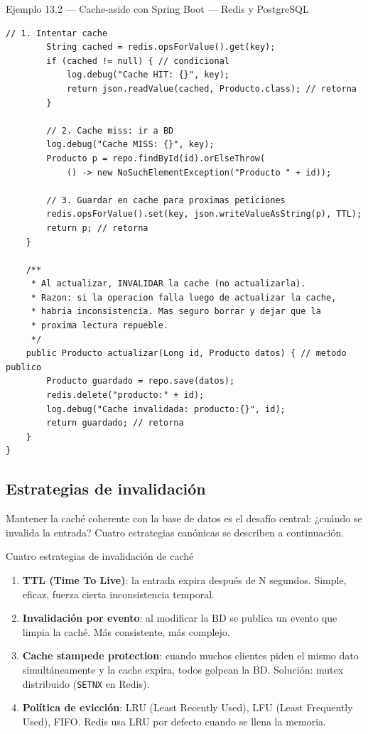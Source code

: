 \begin{cajaejemplo}{Ejemplo 13.2 --- Cache-aside con Spring Boot --- Redis y PostgreSQL}
\begin{lstlisting}[style=java,caption={ProductoService.java},label=lst:13.3]
        // 1. Intentar cache
        String cached = redis.opsForValue().get(key);
        if (cached != null) { // condicional
            log.debug("Cache HIT: {}", key);
            return json.readValue(cached, Producto.class); // retorna
        }

        // 2. Cache miss: ir a BD
        log.debug("Cache MISS: {}", key);
        Producto p = repo.findById(id).orElseThrow(
            () -> new NoSuchElementException("Producto " + id));

        // 3. Guardar en cache para proximas peticiones
        redis.opsForValue().set(key, json.writeValueAsString(p), TTL);
        return p; // retorna
    }

    /**
     * Al actualizar, INVALIDAR la cache (no actualizarla).
     * Razon: si la operacion falla luego de actualizar la cache,
     * habria inconsistencia. Mas seguro borrar y dejar que la
     * proxima lectura repueble.
     */
    public Producto actualizar(Long id, Producto datos) { // metodo publico
        Producto guardado = repo.save(datos);
        redis.delete("producto:" + id);
        log.debug("Cache invalidada: producto:{}", id);
        return guardado; // retorna
    }
}
\end{lstlisting}
\end{cajaejemplo}

\subsection{Estrategias de invalidación}

Mantener la caché coherente con la base de datos es el
desafío central: ¿cuándo se invalida la entrada? Cuatro estrategias
canónicas se describen a continuación.


\begin{cajabuenas}{Cuatro estrategias de invalidación de caché}
\begin{enumerate}
\item \textbf{TTL (Time To Live)}: la entrada expira después de
N segundos. Simple, eficaz, fuerza cierta inconsistencia temporal.
\item \textbf{Invalidación por evento}: al modificar la BD se publica
un evento que limpia la caché. Más consistente, más complejo.
\item \textbf{Cache stampede protection}: cuando muchos clientes
piden el mismo dato simultáneamente y la cache expira, todos
golpean la BD. Solución: mutex distribuido (\texttt{SETNX} en Redis).
\item \textbf{Política de evicción}: LRU (Least Recently Used), LFU
(Least Frequently Used), FIFO. Redis usa LRU por defecto cuando se
llena la memoria.
\end{enumerate}
\end{cajabuenas}

